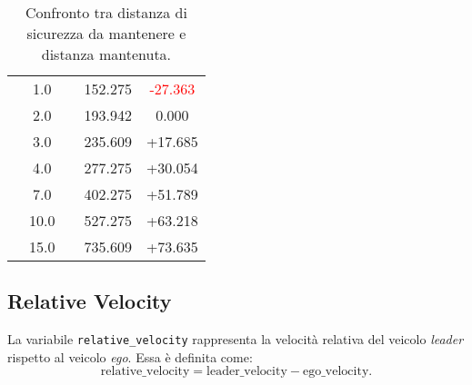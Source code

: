 \begin{table}[h!]
{\begin{tabular}{|c|c|c|c|c|}
                     & 1.0 &  & 152.275 & \textcolor{red}{-27.363} \\
                     & 2.0 &  & 193.942 & 0.000 \\
                     & 3.0 &  & 235.609 & \textcolor[rgb]{0.0,0.5,0.0}{+17.685}   \\
                     & 4.0 &  & 277.275 & \textcolor[rgb]{0.0,0.5,0.0}{+30.054}  \\
                     & 7.0 &  & 402.275 & \textcolor[rgb]{0.0,0.5,0.0}{+51.789}  \\
                     & 10.0 &  & 527.275 & \textcolor[rgb]{0.0,0.5,0.0}{+63.218} \\
                     & 15.0 &  & 735.609 & \textcolor[rgb]{0.0,0.5,0.0}{+73.635} \\
\hline
\end{tabular}
}
\caption{Confronto tra distanza di sicurezza da mantenere e distanza mantenuta.}
\label{tab:d_sicurezza_mantenuta}
\end{table}

\subsection{Relative Velocity}
La variabile \texttt{relative\_velocity} rappresenta la velocità relativa del veicolo \emph{leader} rispetto al veicolo \emph{ego}.
Essa è definita come:
\[
\text{relative\_velocity} = \text{leader\_velocity} - \text{ego\_velocity}.
\]
